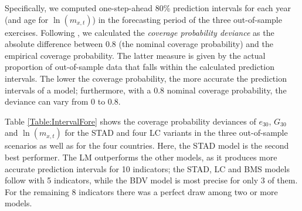 \documentclass[Thesis]{subfiles}
\begin{document}
Specifically, we computed one-step-ahead 80\% prediction intervals for each year (and age for $\ln(m_{x,t})$) in the forecasting period of the three out-of-sample exercises. Following \cite{shang2011point}, we calculated the \textit{coverage probability deviance} as the absolute difference between 0.8 (the nominal coverage probability) and the empirical coverage probability. The latter measure is given by the actual proportion of out-of-sample data that falls within the calculated prediction intervals. The lower the coverage probability, the more accurate the prediction intervals of a model; furthermore, with a 0.8 nominal coverage probability, the deviance can vary from 0 to 0.8.

Table \ref{Table:IntervalFore} shows the coverage probability deviances of $e_{30}$, $G_{30}$ and $\ln(m_{x,t})$ for the STAD and four LC variants in the three out-of-sample scenarios as well as for the four countries. Here, the STAD model is the second best performer. The LM outperforms the other models, as it produces more accurate prediction intervals for 10 indicators; the STAD, LC and BMS models follow with 5 indicators, while the BDV model is most precise for only 3 of them. For the remaining 8 indicators there was a perfect draw among two or more models.
\end{document}
